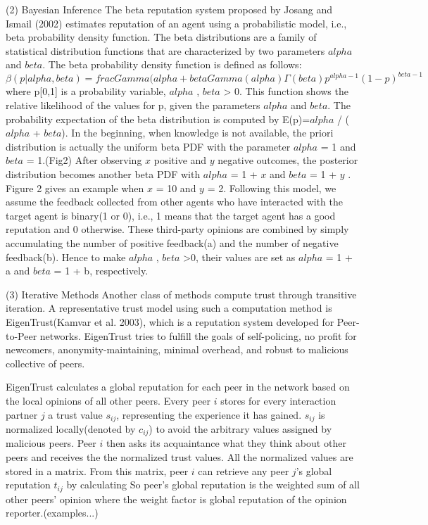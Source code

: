 \documentclass[11pt]{article}
\begin{document}
(2) Bayesian Inference
The beta reputation system proposed by Josang and Ismail (2002) estimates reputation of an agent using a probabilistic model, i.e., beta probability density function. The beta distributions are a family of statistical distribution functions that are characterized by two parameters $alpha$ and $beta$. The beta probability density function is defined as follows:
$$\beta(p|alpha, beta)=frac{Gamma(alpha + beta}{Gamma(alpha)\Gamma(beta)}p^{alpha-1}(1-p)^{beta-1}$$
where p[0,1] is a probability variable, $alpha$ , $beta$ > 0. This function shows the relative likelihood of the values for p, given the parameters $alpha$ and $beta$. The probability expectation of the beta distribution is computed by E(p)=$alpha$ / ($alpha$ + $beta$). In the beginning, when knowledge is not available, the priori distribution is actually the uniform beta PDF with the parameter $alpha$ = 1 and $beta$ = 1.(Fig2) After observing $x$ positive and $y$ negative outcomes, the posterior distribution becomes another beta PDF with $alpha$ = 1 + $x$ and $beta$ = 1 + $y$ . Figure 2 gives an example when $x$ = 10 and $y$ = 2. Following this model, we assume the feedback collected from other agents who have interacted with the target agent is binary(1 or 0), i.e., 1 means that the target agent has a good reputation and 0 otherwise. These third-party opinions are combined by simply accumulating the number of positive feedback(a) and the number of negative feedback(b). Hence to make $alpha$ , $beta$ >0, their values are set as $alpha$ = 1 + a and $beta$ = 1 + b, respectively.

(3) Iterative Methods
Another class of methods compute trust through transitive iteration. A representative trust model using such a computation method is EigenTrust(Kamvar et al. 2003), which is a reputation system developed for Peer-to-Peer networks. EigenTrust tries to fulfill the goals of self-policing, no profit for newcomers, anonymity-maintaining, minimal overhead, and robust to malicious collective of peers.

EigenTrust calculates a global reputation for each peer in the network based on the local opinions of all other peers. Every peer $i$ stores for every interaction partner $j$ a trust value $s_{ij}$, representing the experience it has gained. $s_{ij}$ is normalized locally(denoted by $c_{ij}$) to avoid the arbitrary values assigned by malicious peers. Peer $i$ then asks its acquaintance what they think about other peers and receives the the normalized trust values. All the normalized values are stored in a matrix. From this matrix, peer $i$ can retrieve any peer $j$'s global reputation $t_{ij}$ by calculating 
So peer's global reputation is the weighted sum of all other peers' opinion where the weight factor is global reputation of the opinion reporter.(examples...)
\end{document}
